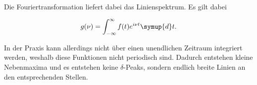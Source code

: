 Die Fouriertransformation liefert dabei das Linienspektrum. Es gilt dabei

\begin{equation}
\label{eqn:fouriertrafo}
    g(\nu) = \int_{-\infty}^{\infty} f(t) e^{i\nu t} \symup{d}t.
\end{equation}

In der Praxis kann allerdings nicht über einen unendlichen Zeitraum integriert werden, weshalb diese Funktionen nicht periodisch sind. Dadurch entstehen kleine Nebenmaxima und es entstehen keine $\delta$-Peaks, sondern endlich breite Linien an den entsprechenden Stellen.
